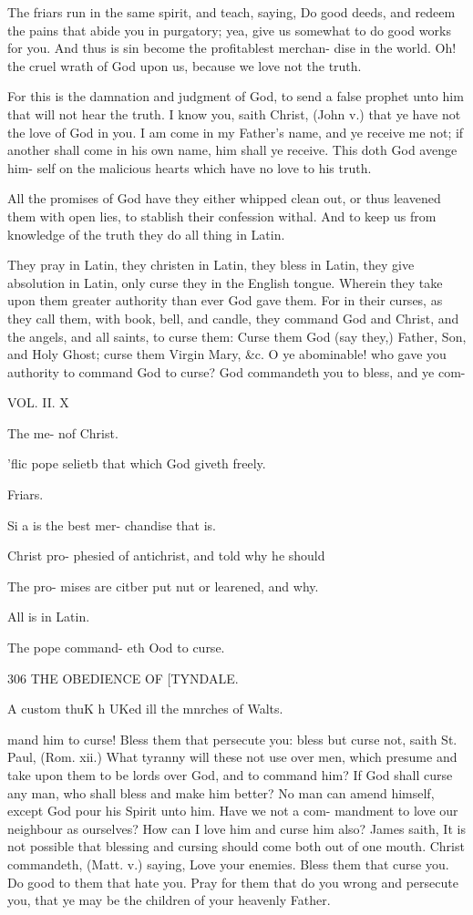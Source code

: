 \documentclass{custom}
\begin{document}
{The friars run in the same spirit, and teach, saying, 
Do good deeds, and redeem the pains that abide you in 
purgatory; yea, give us somewhat to do good works for 
you. And thus is sin become the profitablest merchan- 
dise in the world. Oh! the cruel wrath of God upon us, 
because we love not the truth. 

For this is the damnation and judgment of God, to 
send a false prophet unto him that will not hear the truth. 
I know you, saith Christ, (John v.) that ye have not the 
love of God in you. I am come in my Father's name, 
and ye receive me not; if another shall come in his own 
name, him shall ye receive. This doth God avenge him- 
self on the malicious hearts which have no love to his 
truth. 

All the promises of God have they either whipped clean 
out, or thus leavened them with open lies, to stablish 
their confession withal. And to keep us from knowledge 
of the truth they do all thing in Latin. 

They pray in Latin, they christen in Latin, they bless 
in Latin, they give absolution in Latin, only curse they 
in the English tongue. Wherein they take upon them 
greater authority than ever God gave them. For in their 
curses, as they call them, with book, bell, and candle, 
they command God and Christ, and the angels, and all 
saints, to curse them: Curse them God (say they,) Father, 
Son, and Holy Ghost; curse them Virgin Mary, &c. O 
ye abominable! who gave you authority to command God 
to curse? God commandeth you to bless, and ye com- 

VOL. II. X 

The me- 
n\fi of 
Christ. 

'flic pope 
selietb that 
which God 
giveth 
freely. 

Friars. 

Si a is the 
best mer- 
chandise 
that is. 

Christ pro- 
phesied of 
antichrist, 
and told 
why he 
should 

The pro- 
mises are 
citber put 
nut or 
learened, 
and why. 

All is in 
Latin. 

The pope 
command- 
eth Ood to 
curse. 


306
THE OBEDIENCE OF
[TYNDALE.

A custom 
thuK h UKed 
ill the 
mnrches of 
Walts. 

mand him to curse! Bless them that persecute you: 
bless but curse not, saith St. Paul, (Rom. xii.) What 
tyranny will these not use over men, which presume and 
take upon them to be lords over God, and to command 
him? If God shall curse any man, who shall bless and 
make him better? No man can amend himself, except 
God pour his Spirit unto him. Have we not a com- 
mandment to love our neighbour as ourselves? How can 
I love him and curse him also? James saith, It is not 
possible that blessing and cursing should come both out of 
one mouth. Christ commandeth, (Matt. v.) saying, Love 
your enemies. Bless them that curse you. Do good to 
them that hate you. Pray for them that do you wrong 
and persecute you, that ye may be the children of your 
heavenly Father. 

}
\end{document}
